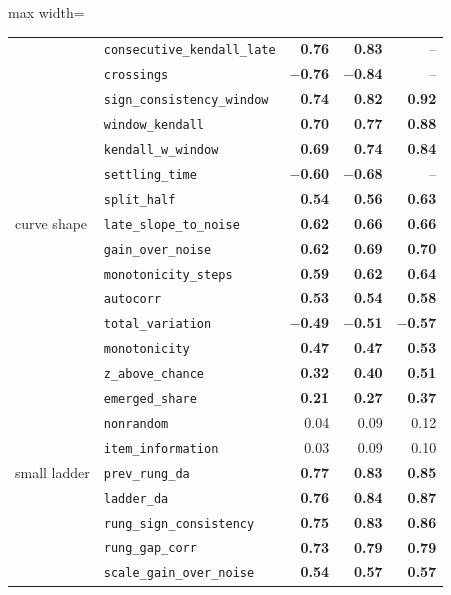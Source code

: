 \begin{table}[t]
\begin{adjustbox}{max width=\textwidth}
\begin{tabular}{@{}llrrr@{}}
 & \texttt{consecutive\_kendall\_late} & \textbf{0.76} & \textbf{0.83} & -- \\
 & \texttt{crossings} & \textbf{$-$0.76} & \textbf{$-$0.84} & -- \\
 & \texttt{sign\_consistency\_window} & \textbf{0.74} & \textbf{0.82} & \textbf{0.92} \\
 & \texttt{window\_kendall} & \textbf{0.70} & \textbf{0.77} & \textbf{0.88} \\
 & \texttt{kendall\_w\_window} & \textbf{0.69} & \textbf{0.74} & \textbf{0.84} \\
 & \texttt{settling\_time} & \textbf{$-$0.60} & \textbf{$-$0.68} & -- \\
 & \texttt{split\_half} & \textbf{0.54} & \textbf{0.56} & \textbf{0.63} \\
\midrule
curve shape & \texttt{late\_slope\_to\_noise} & \textbf{0.62} & \textbf{0.66} & \textbf{0.66} \\
 & \texttt{gain\_over\_noise} & \textbf{0.62} & \textbf{0.69} & \textbf{0.70} \\
 & \texttt{monotonicity\_steps} & \textbf{0.59} & \textbf{0.62} & \textbf{0.64} \\
 & \texttt{autocorr} & \textbf{0.53} & \textbf{0.54} & \textbf{0.58} \\
 & \texttt{total\_variation} & \textbf{$-$0.49} & \textbf{$-$0.51} & \textbf{$-$0.57} \\
 & \texttt{monotonicity} & \textbf{0.47} & \textbf{0.47} & \textbf{0.53} \\
 & \texttt{z\_above\_chance} & \textbf{0.32} & \textbf{0.40} & \textbf{0.51} \\
 & \texttt{emerged\_share} & \textbf{0.21} & \textbf{0.27} & \textbf{0.37} \\
 & \texttt{nonrandom} & 0.04 & 0.09 & 0.12 \\
 & \texttt{item\_information} & 0.03 & 0.09 & 0.10 \\
\midrule
small ladder & \texttt{prev\_rung\_da} & \textbf{0.77} & \textbf{0.83} & \textbf{0.85} \\
 & \texttt{ladder\_da} & \textbf{0.76} & \textbf{0.84} & \textbf{0.87} \\
 & \texttt{rung\_sign\_consistency} & \textbf{0.75} & \textbf{0.83} & \textbf{0.86} \\
 & \texttt{rung\_gap\_corr} & \textbf{0.73} & \textbf{0.79} & \textbf{0.79} \\
 & \texttt{scale\_gain\_over\_noise} & \textbf{0.54} & \textbf{0.57} & \textbf{0.57} \\

\end{tabular}
\end{adjustbox}
\end{table}
